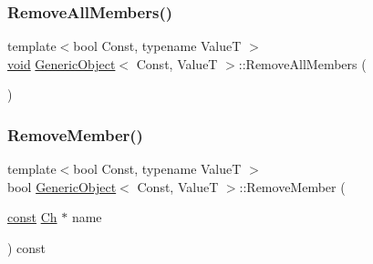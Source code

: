 \mbox{\label{classGenericObject_a129ce3843a6658e620a7f740d9f44ee1}} 
\subsubsection{\texorpdfstring{Remove\+All\+Members()}{RemoveAllMembers()}}
{\footnotesize\ttfamily template$<$bool Const, typename ValueT $>$ \\
\hyperlink{imgui__impl__opengl3__loader_8h_ac668e7cffd9e2e9cfee428b9b2f34fa7}{void} \hyperlink{classGenericObject}{Generic\+Object}$<$ Const, ValueT $>$\+::Remove\+All\+Members (\begin{DoxyParamCaption}{ }\end{DoxyParamCaption})\hspace{0.3cm}{\ttfamily [inline]}}

\mbox{\label{classGenericObject_aebeda9c2cac6afd56dda55caaf2c4a0c}} 
\subsubsection{\texorpdfstring{Remove\+Member()}{RemoveMember()}\hspace{0.1cm}{\footnotesize\ttfamily [1/3]}}
{\footnotesize\ttfamily template$<$bool Const, typename ValueT $>$ \\
bool \hyperlink{classGenericObject}{Generic\+Object}$<$ Const, ValueT $>$\+::Remove\+Member (\begin{DoxyParamCaption}\item[{\hyperlink{classGenericObject_af70c9646b5e422306c33e98b3d8783a7}{const} \hyperlink{classGenericObject_ac6747e5baa13e15bcea1658b5624647a}{Ch} $\ast$}]{name }\end{DoxyParamCaption}) const\hspace{0.3cm}{\ttfamily [inline]}}

\mbox{\label{classGenericObject_a8e29dc07b992e71e35dd93a57f95842c}} 
